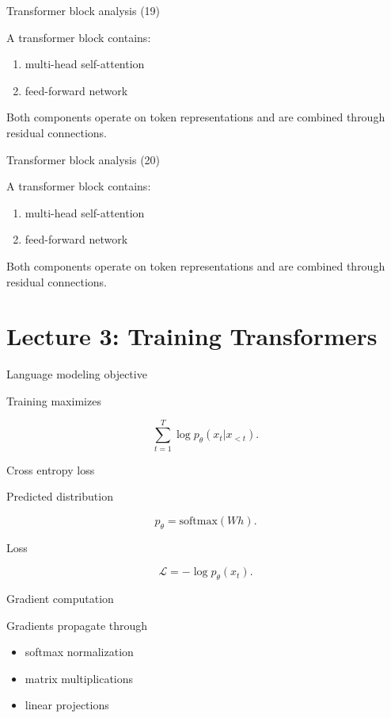 \documentclass[aspectratio=169]{beamer}
\begin{document}
\begin{frame}{Transformer block analysis (19)}

A transformer block contains:

\begin{enumerate}
\item multi-head self-attention
\item feed-forward network
\end{enumerate}

Both components operate on token representations and are
combined through residual connections.

\end{frame}


\begin{frame}{Transformer block analysis (20)}

A transformer block contains:

\begin{enumerate}
\item multi-head self-attention
\item feed-forward network
\end{enumerate}

Both components operate on token representations and are
combined through residual connections.

\end{frame}


\section{Lecture 3: Training Transformers}


\begin{frame}{Language modeling objective}

Training maximizes

\[
\sum_{t=1}^T \log p_\theta(x_t|x_{<t}).
\]

\end{frame}


\begin{frame}{Cross entropy loss}

Predicted distribution

\[
p_\theta = \text{softmax}(Wh).
\]

Loss

\[
\mathcal L = -\log p_\theta(x_t).
\]

\end{frame}


\begin{frame}{Gradient computation}

Gradients propagate through

\begin{itemize}
\item softmax normalization
\item matrix multiplications
\item linear projections
\end{itemize}

\end{frame}
\end{document}
